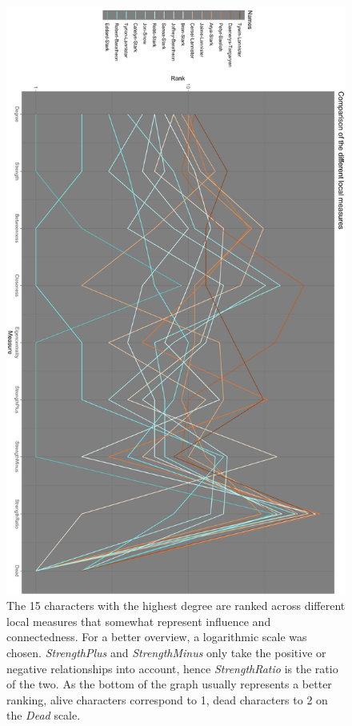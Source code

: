 \begin{figure}
    \centering
    \includegraphics[scale=0.34]{plots/measurecomparison.png}
    \caption{The 15 characters with the highest degree are ranked across different local measures that somewhat represent influence and connectedness. For a better overview, a logarithmic scale was chosen. \textit{StrengthPlus} and \textit{StrengthMinus} only take the positive or negative relationships into account, hence \textit{StrengthRatio} is the ratio of the two. As the bottom of the graph usually represents a better ranking, alive characters correspond to 1, dead characters to 2 on the \textit{Dead} scale.}
    \label{fig:measurecomparison}
\end{figure}


